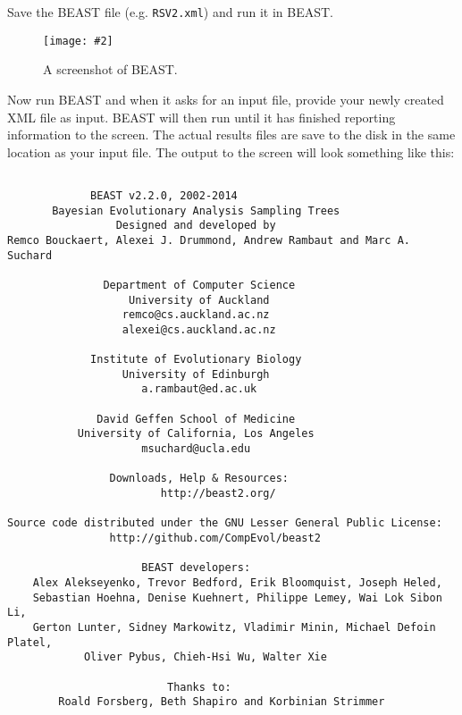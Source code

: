 \documentclass[12pt]{article}
\newcommand{\includeimage}[2][]{%
\texttt{[image: \#2]}
}
\begin{document}
Save the BEAST file (e.g. \texttt{RSV2.xml}) and run it in BEAST.

\begin{figure}
\centering	
\includeimage[width=0.7\textwidth]{figures/BEAST}
\caption{A screenshot of BEAST.}
\label{fig:BEAST}
\end{figure}

Now run BEAST and when it asks for an input file, provide your newly
created XML file as input. BEAST will then run until it has finished
reporting information to the screen. The actual results files are
save to the disk in the same location as your input file. The output to the screen will
look something like this: 

{\tiny   
\begin{verbatim}

             BEAST v2.2.0, 2002-2014
       Bayesian Evolutionary Analysis Sampling Trees
                 Designed and developed by
Remco Bouckaert, Alexei J. Drummond, Andrew Rambaut and Marc A. Suchard
                              
               Department of Computer Science
                   University of Auckland
                  remco@cs.auckland.ac.nz
                  alexei@cs.auckland.ac.nz
                              
             Institute of Evolutionary Biology
                  University of Edinburgh
                     a.rambaut@ed.ac.uk
                              
              David Geffen School of Medicine
           University of California, Los Angeles
                     msuchard@ucla.edu
                              
                Downloads, Help & Resources:
                    	http://beast2.org/
                              
Source code distributed under the GNU Lesser General Public License:
             	http://github.com/CompEvol/beast2
                              
                     BEAST developers:
	Alex Alekseyenko, Trevor Bedford, Erik Bloomquist, Joseph Heled, 
	Sebastian Hoehna, Denise Kuehnert, Philippe Lemey, Wai Lok Sibon Li, 
	Gerton Lunter, Sidney Markowitz, Vladimir Minin, Michael Defoin Platel, 
          	Oliver Pybus, Chieh-Hsi Wu, Walter Xie
                              
                         Thanks to:
    	Roald Forsberg, Beth Shapiro and Korbinian Strimmer


\end{verbatim}}
\end{document}
